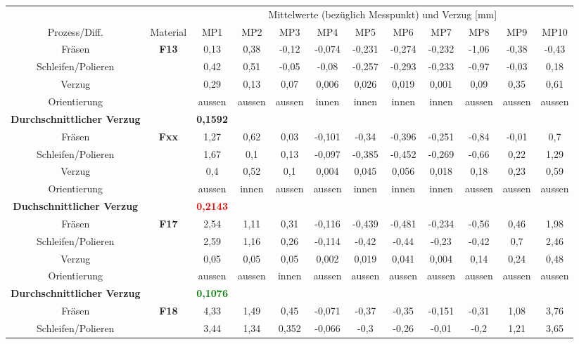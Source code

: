 \documentclass[12pt,a4paper,parskip,twoside,BCOR5mm,headsepline]{scrartcl}
\begin{document}
\begin{description*}
\begin{table}
\begin{tabular}{cccccccccccc}
\toprule
&& \multicolumn{10}{c}{Mittelwerte (bezüglich Messpunkt) und Verzug [\si{\milli\meter}]} \\
\cmidrule(2){3-12}
Prozess/Diff. & Material & MP1 & MP2 & MP3 & MP4 & MP5 & MP6 & MP7 & MP8 & MP9 & MP10 \\
\midrule
 Fräsen& \textbf{F13} &0,13  &0,38 &-0,12 &-0,074 & -0,231 &-0,274 & -0,232 & -1,06 & -0,38 & -0,43 \\
 Schleifen/Polieren&&0,42  &0,51 & -0,05 & -0,08 & -0,257&-0,293  &-0,233  & -0,97 & -0,03 &0,18  \\
Verzug &&0,29  &0,13  & 0,07 &0,006  & 0,026 &0,019  &0,001  &0,09  & 0,35 &0,61 \\
Orientierung && aussen & aussen & aussen &innen  & innen &innen  & innen &aussen  & aussen &aussen  \\
\textbf{Durchschnittlicher Verzug} &&\textbf{0,1592}&&&&&&&&&\\
\midrule
Fräsen & \textbf{Fxx} & 1,27& 0,62 &0,03  &-0,101  &-0,34  &-0,396  & -0,251 &-0,84  & -0,01 &0,7 \\
Schleifen/Polieren &&1,67  &0,1  & 0,13 &-0,097  & -0,385 &-0,452  &-0,269  &-0,66  & 0,22 &1,29 \\
Verzug &&0,4  &0,52  & 0,1 &0,004  & 0,045 &0,056  &0,018  &0,18  &0,23  &0,59  \\
Orientierung &&aussen  &innen &aussen  & aussen& innen &innen & innen &aussen &aussen  & aussen \\
\textbf{Duchschnittlicher Verzug} && \textbf{\textcolor{red}{0,2143}}&&&&&&&&&\\
\midrule
Fräsen& \textbf{F17} &2,54  & 1,11 &0,31  &-0,116  &-0,439  & -0,481 &-0,234  &-0,56  & 0,46 &1,98  \\
Schleifen/Polieren &&2,59 &1,16  &0,26 & -0,114 & -0,42 & -0,44  & -0,23 &-0,42  &0,7  & 2,46  \\
Verzug &&0,05  & 0,05 &0,05 &0,002  & 0,019 & 0,041 &0,004   &0,14  & 0,24 & 0,48 \\
Orientierung && aussen & aussen &innen  &aussen  &aussen &aussen  &aussen &aussen  &aussen  & aussen \\
\textbf{Durchschnittlicher Verzug} && \textbf{\textcolor{green}{0,1076}} &&&&&&&&&\\
\midrule
 Fräsen& \textbf{F18} &4,33  & 1,49 &0,45  & -0,071 &-0,37  &-0,35  &-0,151  & -0,31 &1,08 &3,76  \\
Schleifen/Polieren &&3,44 &1,34 &0,352  &-0,066  & -0,3 &-0,26  &-0,01  &-0,2 &1,21 &3,65  \\

\end{tabular}
\end{table}
\end{description*}
\end{document}
